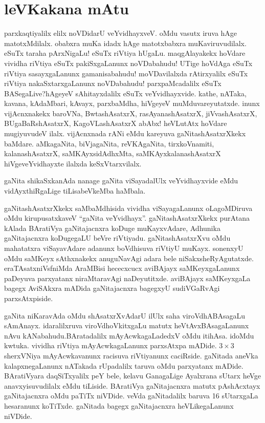 \chapter*{leVKakana mAtu}


parxkaqtiyalilx elilx noVDidarU veYvidhayxveV. oMdu vasutx iruva hAge matotxMdilalx. obabxra\- muKa idadx hAge matotxbabxra muKaviruvudilalx. eSuTx taraha pArxNigaLu! eSuTx\- riVtiya hUgaLu. maqgAlayakekx hoVdare vividha riVtiya eSuTx pakiSxgaLanunx noVDa\-bahudu! UTige hoVdAga eSuTx riVtiya sasayxgaLanunx gamanisabahudu! moVDavilalxda rAtirxyalilx eSuTx riVtiya nakaSxtarxgaLanunx noVDabahudu! parxpaMcadalilx eSuTx BASegaLive?\break hAgeyeV sAhitayxdalilx eSuTx veYvidhayxvide. kathe, nATaka, kavana, kAdaMbari, kAvayx, parxbaMdha, hiVgeyeV muMduvareyutatxde. inunx vijAcnxnakekx baroVNa, BwtashAsatxrX, rasAyanashAsatxrX, jiVvashAsatxrX, BUgaBaRshAsatxrX, KagoVLashAsatxrX abAbx! heVLutAtx hoVdare mugiyu\-vudeV ilalx. vijAcnxnada rANi eMdu kareyuva gaNitashAsatxrXkekx baMdare. aMkagaNita, biVjagaNita,\- reVKAgaNita, tirxkoVnamiti, kalanashAsatxrX, saMKAyxsidAdhxMta, saMKAyxkalanashAsatxrX hiVge\break veYvidhayxte ilalxda keSxVtarxvilalx.

gaNita shikaSxkanAda nanage gaNita viSayadalUlx veYvidhayxvide eMdu vidAyxthiRgaLige tiLisabeVkeMba haMbala.

gaNitashAsatxrXkekx saMbaMdhisida vividha viSayagaLanunx oLagoMDiruva oMdu kirupusatxkaveV ``gaNita veYvidhayx''. gaNitashAsatxrXkekx purAtana kAlada BAratiVya gaNitajacnxra koDuge muKayxvAdare, Adhunika gaNitajacnxra koDugegaLU beVre riVtiyadu. gaNitashAsatxrXvu oMdu mahatatxra viSayavAdare adanunx boVdhisuva riVtiyU muKayx. sonenxyU oMdu saMKeyx sAthxnakekx anuguNavAgi adara bele niSakxsheRyAgutatxde. eraTAsatxniVsfniMda AraMBisi hececxcucx aviBAjayx saMKeyxgaLanunx paDeyuva parxyatanx niraMtaravAgi naDeyutitxde. aviBAjayx saMKeyxgaLa bagegx AviSAkxra mADida gaNitajacnxra bagegxyU sudiVGaRvAgi parxsAtxpiside.

gaNita niKaravAda oMdu shAsatxrXvAdarU ilUlx saha viroVdhABAsagaLu sAmAnayx. idaralilxruva viroVdhoVkitxgaLu matutx heVtAvxBAsagaLanunx nAvu kANabahudu.\break BAratadalilx mAyAcwkagaLadedxV oMdu itihAsa. idoMdu kwtuka. vividha riVtiya mAyA\-cwkagaLanunx parxsAtxpa mADide. $3\times 3$ sherxVNiya mAyAcwkavanunx racisuva riVtiyanunx caciRside. gaNitada aneVka kalapxnegaLanunx nATakada rUpadalilx taruva oMdu parxya\-tanx mADide. BAratiVyara daqSiTxyalilx peY bele, kelavu GanagaLige Ayalxrana sUtarx heVge anavxyisuvudilalx eMdu tiLiside. BAratiVya gaNitajacnxra matutx pAshAcxtayx gaNitaja\-cnxra oMdu paTiTx niVDide. veVda gaNitadalilx baruva {\rm 16} sUtarxgaLa hesaranunx koTiTxde. gaNitada bagegx gaNitajacnxra heVLikegaLanunx niVDide.

